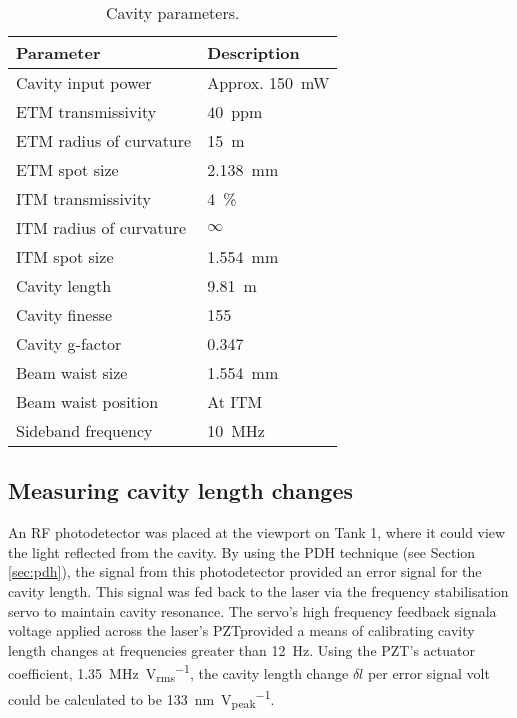 \begin{table}
  \centering
  \begin{tabular}{|l|l|}
    \hline
    \textbf{Parameter}        & \textbf{Description}	      \\ \hline
    Cavity input power      & Approx. \SI{150}{\milli\watt}   \\ \hline
    \gls{ETM} transmissivity      & $40$~ppm                  \\ \hline
    \gls{ETM} radius of curvature & \SI{15}{\meter}           \\ \hline
    \gls{ETM} spot size           & \SI{2.138}{\milli \meter} \\ \hline
    \gls{ITM} transmissivity      & \SI{4}{\%}                \\ \hline
    \gls{ITM} radius of curvature & $\infty$                  \\ \hline
    \gls{ITM} spot size           & \SI{1.554}{\milli \meter} \\ \hline
    Cavity length           & \SI{9.81}{\meter}               \\ \hline
    Cavity finesse          & \SI{155}{}                      \\ \hline
    Cavity g-factor         & \SI{0.347}{}                    \\ \hline
    Beam waist size         & \SI{1.554}{\milli \meter}       \\ \hline
    Beam waist position     & At \gls{ITM}                    \\ \hline
    Sideband frequency      & \SI{10}{\mega\hertz}            \\ \hline
  \end{tabular}
  \caption[Cavity parameters]{\label{tab:cavity-parameters}Cavity parameters.}
\end{table}

\subsection{\label{sec:cavity-length-measurement}Measuring cavity length changes}

An \gls{RF} photodetector was placed at the viewport on Tank 1, where it could view the light reflected from the cavity. By using the \gls{PDH} technique (see Section\,\ref{sec:pdh}), the signal from this photodetector provided an error signal for the cavity length. This signal was fed back to the laser via the frequency stabilisation servo to maintain cavity resonance. The servo's high frequency feedback signal\textemdash a voltage applied across the laser's \gls{PZT}\textemdash provided a means of calibrating cavity length changes at frequencies greater than \SI{12}{\hertz}. Using the \gls{PZT}'s actuator coefficient, \SI{1.35}{\mega\hertz \per \volt_{rms}}, the cavity length change $\delta l$ per error signal volt could be calculated to be \SI{133}{\nano\meter \per \volt_{peak}}.

